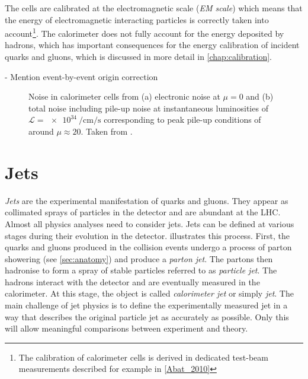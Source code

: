 The cells are calibrated at the electromagnetic scale (\emph{EM scale}) which means that the energy of electromagnetic interacting particles is correctly taken into account\footnote{The calibration of calorimeter cells is derived in dedicated test-beam measurements described for example in \cref{Abat_2010}}. The calorimeter does not fully account for the energy deposited by hadrons, which has important consequences for the energy calibration of incident quarks and gluons, which is discussed in more detail in \cref{chap:calibration}.

- Mention event-by-event origin correction


\begin{figure}
        
    \caption{Noise in calorimeter cells from (a) electronic noise at $\mu=0$ and (b) total noise including pile-up noise at instantaneous luminosities of $\mathcal{L} = \SI{e34}{\per\cm\per\s}$ corresponding to peak pile-up conditions of around $\mu\approx20$. Taken from .}
\end{figure}


\section{Jets}
\emph{Jets} are the experimental manifestation of quarks and gluons.
They appear as collimated sprays of particles in the detector and are abundant at the LHC.
Almost all physics analyses need to consider jets. Jets can be defined at various stages during their evolution in the detector.  illustrates this process. First, the quarks and gluons produced in the collision events undergo a process of parton showering (see \cref{sec:anatomy}) and produce a \emph{parton jet}. The partons then hadronise to form a spray of stable particles referred to as \emph{particle jet}. The hadrons interact with the detector and are eventually measured in the calorimeter. At this stage, the object is called \emph{calorimeter jet} or simply \emph{jet}.
The main challenge of jet physics is to define the experimentally measured jet in a way that describes the original particle jet as accurately as possible.
Only this will allow meaningful comparisons between experiment and theory.

